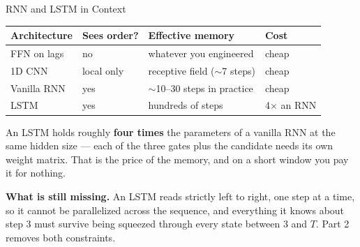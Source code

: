 \documentclass[aspectratio=169, 11pt]{beamer}
\begin{document}
\begin{frame}{RNN and LSTM in Context}
  \begin{center}
    {\small
    \begin{tabular}{llll}
      \toprule
      \textbf{Architecture} & \textbf{Sees order?} & \textbf{Effective memory} & \textbf{Cost} \\
      \midrule
      FFN on lags & no & whatever you engineered & cheap \\
      1D CNN & local only & receptive field ($\sim$7 steps) & cheap \\
      Vanilla RNN & yes & $\sim$10--30 steps in practice & cheap \\
      LSTM & yes & hundreds of steps & 4$\times$ an RNN \\
      \bottomrule
    \end{tabular}
    }
  \end{center}

  \vspace{0.15cm}
  An LSTM holds roughly \textbf{four times} the parameters of a vanilla RNN at the same hidden
  size --- each of the three gates plus the candidate needs its own weight matrix. That is the
  price of the memory, and on a short window you pay it for nothing.

  \vspace{0.15cm}
  \textbf{What is still missing.} An LSTM reads strictly left to right, one step at a time, so
  it cannot be parallelized across the sequence, and everything it knows about step 3 must
  survive being squeezed through every state between 3 and $T$. Part 2 removes both constraints.
\end{frame}
\end{document}
